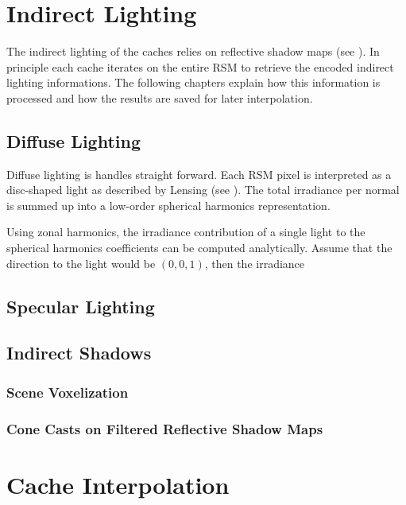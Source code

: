 \documentclass[thesis.tex]{subfiles}
\begin{document}

\section{Indirect Lighting}
The indirect lighting of the caches relies on reflective shadow maps (see ).
In principle each cache iterates on the entire RSM to retrieve the encoded indirect lighting informations.
The following chapters explain how this information is processed and how the results are saved for later interpolation.

\subsection{Diffuse Lighting}
Diffuse lighting is handles straight forward.
Each RSM pixel is interpreted as a disc-shaped light as described by Lensing (see ).
The total irradiance per normal is summed up into a low-order spherical harmonics representation.

Using zonal harmonics, the irradiance contribution of a single light to the spherical harmonics coefficients can be computed analytically.
Assume that the direction to the light would be $(0,0,1)$, then the irradiance 
\begin{equation}
\end{equation}


\subsection{Specular Lighting}


\subsection{Indirect Shadows}

\subsubsection{Scene Voxelization}

\subsubsection{Cone Casts on Filtered Reflective Shadow Maps}


\section{Cache Interpolation}
\end{document}
